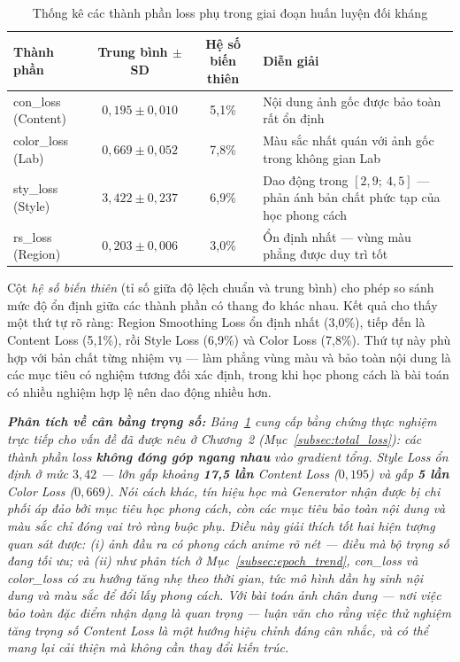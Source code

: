 \begin{table}[H]
\caption{Thống kê các thành phần loss phụ trong giai đoạn huấn luyện đối kháng}
\label{tab:component_loss_stats}
\centering
\begin{tabular}{|l|c|c|p{6cm}|}
\hline
\textbf{Thành phần} & \textbf{Trung bình $\pm$ SD} & \textbf{Hệ số biến thiên} & \textbf{Diễn giải} \\
\hline
con\_loss (Content) & $0{,}195 \pm 0{,}010$ & 5,1\% & Nội dung ảnh gốc được bảo toàn rất ổn định \\
\hline
color\_loss (Lab) & $0{,}669 \pm 0{,}052$ & 7,8\% & Màu sắc nhất quán với ảnh gốc trong không gian Lab \\
\hline
sty\_loss (Style) & $3{,}422 \pm 0{,}237$ & 6,9\% & Dao động trong $[2{,}9;\ 4{,}5]$ --- phản ánh bản chất phức tạp của học phong cách \\
\hline
rs\_loss (Region) & $0{,}203 \pm 0{,}006$ & 3,0\% & Ổn định nhất --- vùng màu phẳng được duy trì tốt \\
\hline
\end{tabular}
\end{table}

Cột \textit{hệ số biến thiên} (tỉ số giữa độ lệch chuẩn và trung bình) cho phép so sánh mức độ ổn định giữa các thành phần có thang đo khác nhau. Kết quả cho thấy một thứ tự rõ ràng: Region Smoothing Loss ổn định nhất (3,0\%), tiếp đến là Content Loss (5,1\%), rồi Style Loss (6,9\%) và Color Loss (7,8\%). Thứ tự này phù hợp với bản chất từng nhiệm vụ --- làm phẳng vùng màu và bảo toàn nội dung là các mục tiêu có nghiệm tương đối xác định, trong khi học phong cách là bài toán có nhiều nghiệm hợp lệ nên dao động nhiều hơn.

\medskip
\noindent\textit{\textbf{Phân tích về cân bằng trọng số:} Bảng~\ref{tab:component_loss_stats} cung cấp bằng chứng thực nghiệm trực tiếp cho vấn đề đã được nêu ở Chương~2 (Mục~\ref{subsec:total_loss}): các thành phần loss \textbf{không đóng góp ngang nhau} vào gradient tổng. Style Loss ổn định ở mức $3{,}42$ --- lớn gấp khoảng \textbf{17,5 lần} Content Loss ($0{,}195$) và gấp \textbf{5 lần} Color Loss ($0{,}669$). Nói cách khác, tín hiệu học mà Generator nhận được bị chi phối áp đảo bởi mục tiêu học phong cách, còn các mục tiêu bảo toàn nội dung và màu sắc chỉ đóng vai trò ràng buộc phụ. Điều này giải thích tốt hai hiện tượng quan sát được: (i) ảnh đầu ra có phong cách anime rõ nét --- điều mà bộ trọng số đang tối ưu; và (ii) như phân tích ở Mục~\ref{subsec:epoch_trend}, con\_loss và color\_loss có xu hướng \textit{tăng nhẹ} theo thời gian, tức mô hình dần hy sinh nội dung và màu sắc để đổi lấy phong cách. Với bài toán ảnh chân dung --- nơi việc bảo toàn đặc điểm nhận dạng là quan trọng --- luận văn cho rằng việc thử nghiệm tăng trọng số Content Loss là một hướng hiệu chỉnh đáng cân nhắc, và có thể mang lại cải thiện mà không cần thay đổi kiến trúc.}

